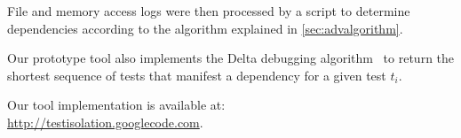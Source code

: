 File and memory access logs were then processed by a script to determine
dependencies according to the algorithm explained in \ref{sec:advalgorithm}.


Our prototype tool also implements the Delta debugging algorithm~\cite{Zeller:2002}
to return the shortest sequence of tests that manifest a dependency
for a given test $t_i$.

Our tool implementation is available at: \\\url{http://testisolation.googlecode.com}.









